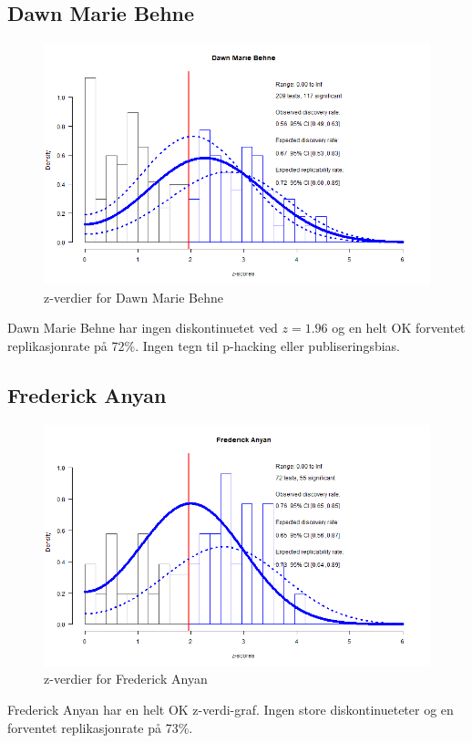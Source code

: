 \documentclass[doc,norsk]{apa7}
\begin{document}
\subsection{Dawn Marie Behne}
\begin{figure}[h!]
    \centering
    \includegraphics[width=\textwidth]{images/Dawn Marie Behne.png}
    \caption{z-verdier for Dawn Marie Behne}
\end{figure}
Dawn Marie Behne har ingen diskontinuetet ved $z=1.96$ og en helt OK forventet replikasjonrate på 72\%. Ingen tegn til p-hacking eller publiseringsbias.

\subsection{Frederick Anyan}
\begin{figure}[h!]
    \centering
    \includegraphics[width=\textwidth]{images/Frederick Anyan.png}
    \caption{z-verdier for Frederick Anyan}
\end{figure}
Frederick Anyan har en helt OK z-verdi-graf. Ingen store diskontinueteter og en forventet replikasjonrate på 73\%.
\end{document}
